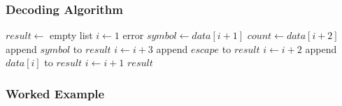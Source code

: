 \subsubsection{Decoding Algorithm}

\begin{algorithm}[H]
\caption{Escape-Based RLE Decoding}
\begin{algorithmic}[1]
    \State $result \gets$ empty list
    \State $i \gets 1$
             \State error \EndIf
            \State $symbol \gets data[i+1]$
            \State $count \gets data[i+2]$
                \State append $symbol$ to $result$
            \EndFor
            \State $i \gets i + 3$
        \Else
             
                \State append $escape$ to $result$
                \State $i \gets i + 2$
            \Else
                \State append $data[i]$ to $result$
                \State $i \gets i + 1$
            \EndIf
        \EndIf
    \EndWhile
    \State \Return $result$
\EndProcedure
\end{algorithmic}
\end{algorithm}

\subsubsection{Worked Example}

